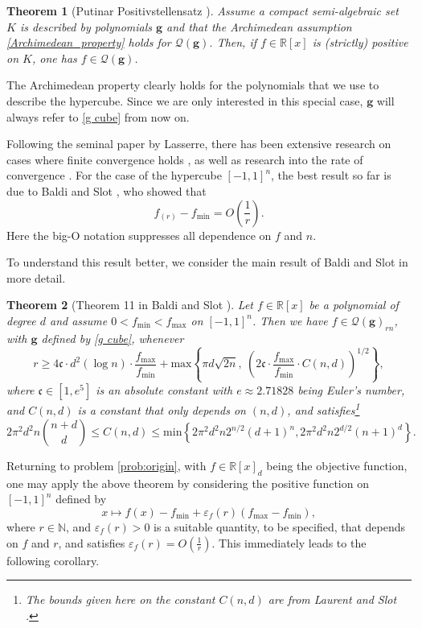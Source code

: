\documentclass[11pt]{article}
\newcommand{\N}{\mathbb{N}}
\newcommand{\R}{\mathbb{R}}
\renewcommand{\min}{\mathrm{min}}
\renewcommand{\max}{\mathrm{max}}
\newtheorem{theorem}{Theorem}
\theoremstyle{definition}
\newcommand{\funcmin}{f_{\min}}
\newcommand{\funcmax}{f_{\max}}
\newcommand{\Chebyconst}{\mathfrak{c}}
\begin{document}
\begin{theorem}[Putinar Positivstellensatz \cite{Putinar1993}]
\label{thm:Putinar}
Assume a compact semi-algebraic set $K$ is described by polynomials $\mathbf{g}$ and that the  Archimedean assumption \eqref{Archimedean_property} holds for $\mathcal{Q}(\mathbf{g})$.
Then, if $f \in \R[x]$ is (strictly) positive on $K$, one has $f \in \mathcal{Q}(\mathbf{g})$.
\end{theorem}
The Archimedean property clearly holds for the polynomials that we use to describe the hypercube. Since we are only interested in this special case,
$\mathbf{g}$ will always refer to \eqref{g cube} from now on.

Following the seminal paper by Lasserre, there has been extensive research on cases where finite convergence holds \cite{Nie2012OptimalityCA,doi:10.1137/080728214,doi:10.1137/100814147}, as well as research into the
 rate of convergence \cite{NIE2007135,10.1007/s10107-020-01537-7,doi:10.1137/23M1555430}.
For the case of the hypercube $[-1,1]^n$, the best result so far is due to Baldi and Slot \cite{doi:10.1137/23M1555430}, who showed that
\[
f_{(r)} - f_\min = O\left(\frac{1}{r}\right).
\]
Here the big-O notation suppresses all dependence on $f$ and $n$.

To understand this result better, we consider  the main result of Baldi and Slot \cite{doi:10.1137/23M1555430} in more detail.

\begin{theorem}[Theorem 11 in Baldi and Slot \cite{doi:10.1137/23M1555430}]
\label{thm:Baldi_Slot}
 Let $f \in \R[x]$ be a polynomial of degree $d$ and assume  $0 < \funcmin < \funcmax$ on $[-1,1]^n$. Then we
 have $f \in \mathcal{Q}(\mathbf{g})_{rn}$, with $\mathbf{g}$ defined by \eqref{g cube}, whenever
\[
    r \geq
    4 \Chebyconst \cdot d^2(\log n) \cdot \frac{\funcmax}{\funcmin} + \max \left\{ \pi d \sqrt{2n}, \ \left(2 \Chebyconst \cdot \frac{\funcmax}{\funcmin} \cdot C(n, d)\right)^{1/2} \right\},
\]
where $\Chebyconst \in [1,e^5]$ is an absolute constant with $e \approx 2.71828$ being Euler's number, and $C(n, d)$ is a constant that only depends on $(n,d)$, and satisfies\footnote{The bounds given here on the constant $C(n,d)$ are from Laurent and Slot \cite[Section 3.3]{Laurent2021AnEV}.}
\[
2\pi^2d^2n \binom{n+d}{d} \le C(n, d)\le \min \left\{ 2\pi^2d^2n2^{n/2}(d + 1)^n, 2\pi^2 d^2n2^{d/2}(n + 1)^d\right\}.
\]
\end{theorem}
Returning to problem \eqref{prob:origin}, with $f \in \R[x]_d$ being the objective function, one may apply the above theorem by considering the positive
function on $[-1,1]^n$ defined by
\[
x \mapsto f(x) - \funcmin + \varepsilon_f(r)\left(f_\max - f_\min \right),
\]
where $r \in \N$, and $\varepsilon_f(r) > 0$ is a suitable quantity, to be specified, that depends on $f$ and $r$, and satisfies
$\varepsilon_f(r) = O\left(\frac{1}{r} \right)$. This immediately leads to the following corollary.
\end{document}
